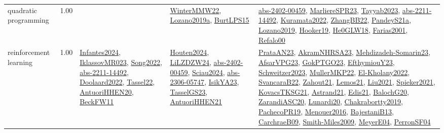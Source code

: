 {\begin{longtable}{p{3cm}r>{\raggedright\arraybackslash}p{6cm}>{\raggedright\arraybackslash}p{6cm}>{\raggedright\arraybackslash}p{8cm}}
\index{quadratic programming}\index{Algorithms!quadratic programming}quadratic programming &  1.00 &  & \hyperref[detail:WinterMMW22]{WinterMMW22}, \hyperref[detail:Lozano2019a]{Lozano2019a}, \hyperref[detail:BurtLPS15]{BurtLPS15} & \hyperref[detail:abs-2402-00459]{abs-2402-00459}, \hyperref[detail:MarliereSPR23]{MarliereSPR23}, \hyperref[detail:Tayyab2023]{Tayyab2023}, \hyperref[detail:abs-2211-14492]{abs-2211-14492}, \hyperref[detail:Kuramata2022]{Kuramata2022}, \hyperref[detail:ZhangBB22]{ZhangBB22}, \hyperref[detail:PandeyS21a]{PandeyS21a}, \hyperref[detail:Lozano2019]{Lozano2019}, \hyperref[detail:Hooker19]{Hooker19}, \hyperref[detail:He0GLW18]{He0GLW18}, \hyperref[detail:Farias2001]{Farias2001}, \hyperref[detail:Refalo00]{Refalo00}\\
\index{reinforcement learning}\index{Algorithms!reinforcement learning}reinforcement learning &  1.00 & \hyperref[detail:Infantes2024]{Infantes2024}, \hyperref[detail:IklassovMR023]{IklassovMR023}, \hyperref[detail:Song2022]{Song2022}, \hyperref[detail:abs-2211-14492]{abs-2211-14492}, \hyperref[detail:Doolaard2022]{Doolaard2022}, \hyperref[detail:Tassel22]{Tassel22}, \hyperref[detail:AntuoriHHEN20]{AntuoriHHEN20}, \hyperref[detail:BeckFW11]{BeckFW11} & \hyperref[detail:Houten2024]{Houten2024}, \hyperref[detail:LiLZDZW24]{LiLZDZW24}, \hyperref[detail:abs-2402-00459]{abs-2402-00459}, \hyperref[detail:Sciau2024]{Sciau2024}, \hyperref[detail:abs-2306-05747]{abs-2306-05747}, \hyperref[detail:IsikYA23]{IsikYA23}, \hyperref[detail:TasselGS23]{TasselGS23}, \hyperref[detail:AntuoriHHEN21]{AntuoriHHEN21} & \hyperref[detail:PrataAN23]{PrataAN23}, \hyperref[detail:AkramNHRSA23]{AkramNHRSA23}, \hyperref[detail:Mehdizadeh-Somarin23]{Mehdizadeh-Somarin23}, \hyperref[detail:AfsarVPG23]{AfsarVPG23}, \hyperref[detail:GokPTGO23]{GokPTGO23}, \hyperref[detail:EfthymiouY23]{EfthymiouY23}, \hyperref[detail:Schweitzer2023]{Schweitzer2023}, \hyperref[detail:MullerMKP22]{MullerMKP22}, \hyperref[detail:El-Kholany2022]{El-Kholany2022}, \hyperref[detail:SvancaraB22]{SvancaraB22}, \hyperref[detail:Zahout21]{Zahout21}, \hyperref[detail:Lemos21]{Lemos21}, \hyperref[detail:Liu2021]{Liu2021}, \hyperref[detail:Spieker2021]{Spieker2021}, \hyperref[detail:KovacsTKSG21]{KovacsTKSG21}, \hyperref[detail:Astrand21]{Astrand21}, \hyperref[detail:Edis21]{Edis21}, \hyperref[detail:BalochG20]{BalochG20}, \hyperref[detail:ZarandiASC20]{ZarandiASC20}, \hyperref[detail:Lunardi20]{Lunardi20}, \hyperref[detail:Chakrabortty2019]{Chakrabortty2019}, \hyperref[detail:PachecoPR19]{PachecoPR19}, \hyperref[detail:Menouer2016]{Menouer2016}, \hyperref[detail:BajestaniB13]{BajestaniB13}, \hyperref[detail:CarchraeB09]{CarchraeB09}, \hyperref[detail:Smith-Miles2009]{Smith-Miles2009}, \hyperref[detail:MeyerE04]{MeyerE04}, \hyperref[detail:PerronSF04]{PerronSF04}\\

\end{longtable}}
